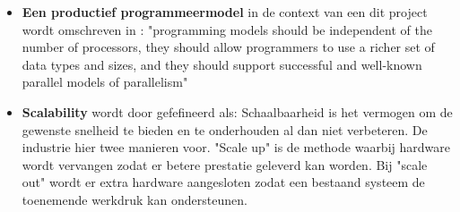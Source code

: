 \begin{itemize}
    \item \textbf{Een productief programmeermodel} in de context van een dit project wordt omschreven in \cite{asanovic2006landscape}: "programming models should be independent of the number of processors, they should allow programmers to use a richer set of data types and sizes, and they should support successful and well-known parallel models of parallelism"

    \item \textbf{Scalability} wordt door \cite{dubey2005recognition} gefefineerd als: Schaalbaarheid is het vermogen om de gewenste snelheid te bieden en te onderhouden al dan niet verbeteren. De industrie hier twee manieren voor. "Scale up" is de methode waarbij hardware wordt vervangen zodat er betere prestatie geleverd kan worden. Bij "scale out" wordt er extra hardware aangesloten zodat een bestaand systeem de toenemende werkdruk kan ondersteunen.
\end{itemize}

\begin{comment}
De grootte van alle databronnen voor een webwinkel per dag ligt tussen de 0.5 MB en 130 MB per dag. Om de data grootte in te schatten met 10.000 webwinkels kan huidige datagrootte van een gemiddelde dag worden ge-extrapoleert. Er moet rekeningen worden gehouden met het Paretoprincipe, dat zou verklaren dat 20\% van de webwinkels verantwoordelijk is voor 80\% van de datagrootte. Dit is ook waar te namen in het analyseren van de datasets. %

\end{comment}